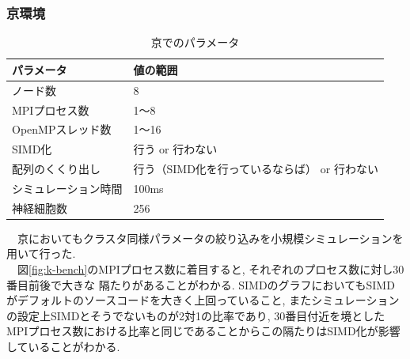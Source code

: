 \subsubsection{京環境}
\begin{table}[htb]
  \caption {京でのパラメータ}
  \begin{center}
    \begin{tabular}{|p{6cm}|p{8cm}|}
      \hline
      パラメータ & 値の範囲\\ \hline
      ノード数 & 8\\ \hline
      MPIプロセス数 & 1〜8\\ \hline
      OpenMPスレッド数 & 1〜16\\ \hline
      SIMD化 & 行う or 行わない\\ \hline
      配列のくくり出し & 行う（SIMD化を行っているならば） or 行わない\\ \hline
      シミュレーション時間 & 100ms\\ \hline
      神経細胞数 & 256\\ \hline
    \end{tabular}
  \end{center}
\end{table}
　京においてもクラスタ同様パラメータの絞り込みを小規模シミュレーションを用いて行った.\\
　図\ref{fig:k-bench}のMPIプロセス数に着目すると, それぞれのプロセス数に対し30番目前後で大きな
隔たりがあることがわかる. SIMDのグラフにおいてもSIMDがデフォルトのソースコードを大きく上回っていること,
またシミュレーションの設定上SIMDとそうでないものが2対1の比率であり,
30番目付近を境としたMPIプロセス数における比率と同じであることからこの隔たりはSIMD化が影響していることがわかる.\\
